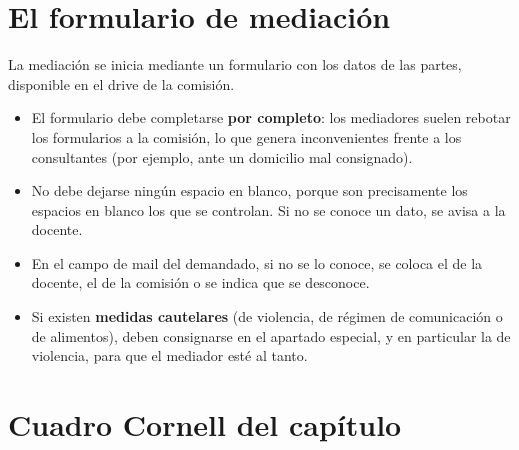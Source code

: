\documentclass[12pt,oneside]{book}
\begin{document}
\section{El formulario de mediación}

La mediación se inicia mediante un formulario con los datos de las partes, disponible en el drive de la comisión.

\begin{itemize}
    \item El formulario debe completarse \textbf{por completo}: los mediadores suelen rebotar los formularios a la comisión, lo que genera inconvenientes frente a los consultantes (por ejemplo, ante un domicilio mal consignado).
    \item No debe dejarse ningún espacio en blanco, porque son precisamente los espacios en blanco los que se controlan. Si no se conoce un dato, se avisa a la docente.
    \item En el campo de mail del demandado, si no se lo conoce, se coloca el de la docente, el de la comisión o se indica que se desconoce.
    \item Si existen \textbf{medidas cautelares} (de violencia, de régimen de comunicación o de alimentos), deben consignarse en el apartado especial, y en particular la de violencia, para que el mediador esté al tanto.
\end{itemize}

\section{Cuadro Cornell del capítulo}
\end{document}
